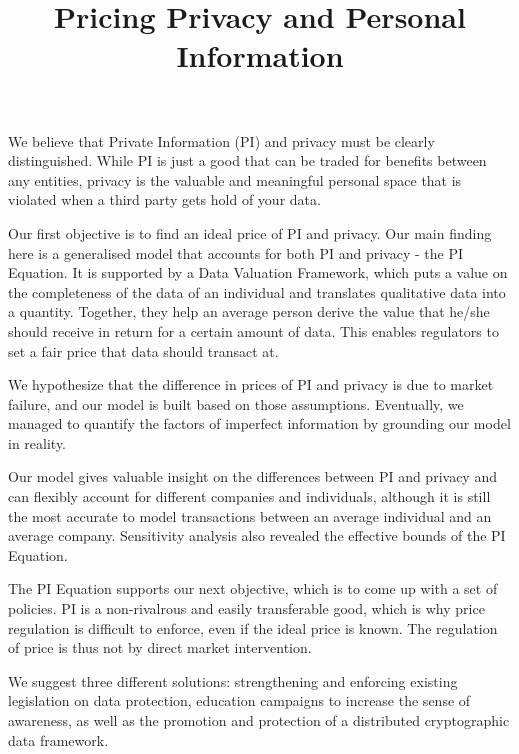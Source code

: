 \documentclass{icmmcm}
\title{Pricing Privacy and Personal Information}
\begin{document}


\begin{summary}

We believe that Private Information (PI) and privacy must be clearly distinguished. While PI is just a good that can be traded for benefits between any entities, privacy is the valuable and meaningful personal space that is violated when a third party gets hold of your data.

Our first objective is to find an ideal price of PI and privacy. Our main finding here is a generalised model that accounts for both PI and privacy - the PI Equation. It is supported by a Data Valuation Framework, which puts a value on the completeness of the data of an individual and translates qualitative data into a quantity. Together, they help an average person derive the value that he/she should receive in return for a certain amount of data. This enables regulators to set a fair price that data should transact at.

We hypothesize that the difference in prices of PI and privacy is due to market failure, and our model is built based on those assumptions. Eventually, we managed to quantify the factors of imperfect information by grounding our model in reality.

Our model gives valuable insight on the differences between PI and privacy and can flexibly account for different companies and individuals, although it is still the most accurate to model transactions between an average individual and an average company. Sensitivity analysis also revealed the effective bounds of the PI Equation.

The PI Equation supports our next objective, which is to come up with a set of policies. PI is a non-rivalrous and easily transferable good, which is why price regulation is difficult to enforce, even if the ideal price is known. The regulation of price is thus not by direct market intervention.

We suggest three different solutions: strengthening and enforcing existing legislation on data protection, education campaigns to increase the sense of awareness, as well as the promotion and protection of a distributed cryptographic data framework.


\end{summary}
\end{document}
